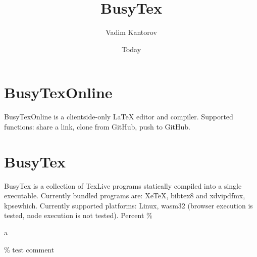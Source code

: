 \documentclass[11pt]{article}
\begin{document}
\title{BusyTex}
\author{Vadim Kantorov}
\date{Today}
\maketitle

\section{BusyTexOnline}
BusyTexOnline is a clientside-only LaTeX editor and compiler. Supported functions: share a link, clone from GitHub, push to GitHub. 

\section{BusyTex}
BusyTex is a collection of TexLive programs statically compiled into a single executable. Currently bundled programs are: XeTeX, bibtex8 and xdvipdfmx, kpsewhich. Currently supported platforms: Linux, wasm32 (browser execution is tested, node execution is not tested). Percent \%

a%


\% test comment


\end{document}
